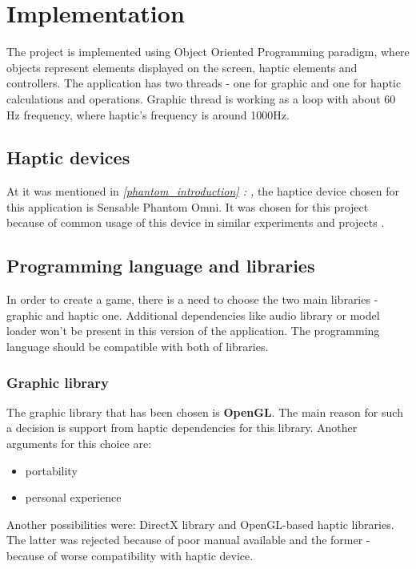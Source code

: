 \chapter{Implementation}
\label{implementation}

The project is implemented using Object Oriented Programming paradigm, where objects represent elements displayed on the screen, haptic elements and controllers. The application has two threads - one for graphic and one for haptic calculations and operations. Graphic thread is working as a loop with about 60 Hz frequency, where haptic's frequency is around 1000Hz. 

\section{Haptic devices}
At it was mentioned in \emph{\ref{phantom_introduction} : ,} the haptice device chosen for this application is Sensable Phantom Omni. It was chosen for this project because of common usage of this device in similar experiments and projects \cite{13}.

\section{Programming language and libraries}
In order to create a game, there is a need to choose the two main libraries - graphic and haptic one. Additional dependencies like audio library or model loader won't be present in this version of the application. The programming language should be compatible with both of libraries. 

\subsection{Graphic library}
The graphic library that has been chosen is \textbf{OpenGL}. The main reason for such a decision is support from haptic dependencies for this library. Another arguments for this choice are: 
\begin{itemize} [noitemsep]
\item portability
\item personal experience
\end{itemize}
Another possibilities were: DirectX library and OpenGL-based haptic libraries. The latter was rejected because of poor manual available and the former - because of worse compatibility with haptic device.

